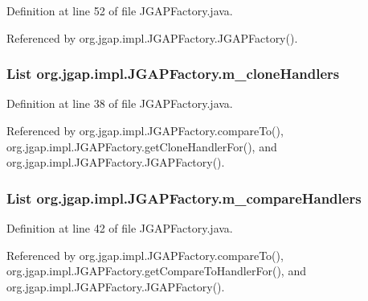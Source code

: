 Definition at line 52 of file J\-G\-A\-P\-Factory.\-java.



Referenced by org.\-jgap.\-impl.\-J\-G\-A\-P\-Factory.\-J\-G\-A\-P\-Factory().

\hypertarget{classorg_1_1jgap_1_1impl_1_1_j_g_a_p_factory_aa72d03a5a931de8e72b11a597a7d7d3a}{
\subsubsection[{m\-\_\-clone\-Handlers}]{\setlength{\rightskip}{0pt plus 5cm}List org.\-jgap.\-impl.\-J\-G\-A\-P\-Factory.\-m\-\_\-clone\-Handlers\hspace{0.3cm}{\ttfamily [private]}}}\label{classorg_1_1jgap_1_1impl_1_1_j_g_a_p_factory_aa72d03a5a931de8e72b11a597a7d7d3a}


Definition at line 38 of file J\-G\-A\-P\-Factory.\-java.



Referenced by org.\-jgap.\-impl.\-J\-G\-A\-P\-Factory.\-compare\-To(), org.\-jgap.\-impl.\-J\-G\-A\-P\-Factory.\-get\-Clone\-Handler\-For(), and org.\-jgap.\-impl.\-J\-G\-A\-P\-Factory.\-J\-G\-A\-P\-Factory().

\hypertarget{classorg_1_1jgap_1_1impl_1_1_j_g_a_p_factory_ae81abfbce4a339cd1b928df0aa5a5e1c}{
\subsubsection[{m\-\_\-compare\-Handlers}]{\setlength{\rightskip}{0pt plus 5cm}List org.\-jgap.\-impl.\-J\-G\-A\-P\-Factory.\-m\-\_\-compare\-Handlers\hspace{0.3cm}{\ttfamily [private]}}}\label{classorg_1_1jgap_1_1impl_1_1_j_g_a_p_factory_ae81abfbce4a339cd1b928df0aa5a5e1c}


Definition at line 42 of file J\-G\-A\-P\-Factory.\-java.



Referenced by org.\-jgap.\-impl.\-J\-G\-A\-P\-Factory.\-compare\-To(), org.\-jgap.\-impl.\-J\-G\-A\-P\-Factory.\-get\-Compare\-To\-Handler\-For(), and org.\-jgap.\-impl.\-J\-G\-A\-P\-Factory.\-J\-G\-A\-P\-Factory().

